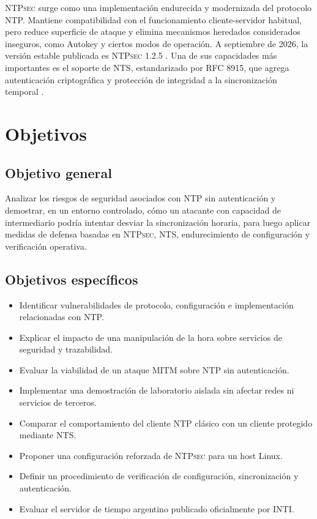 \documentclass[11pt,a4paper]{article}
\newcommand{\ntpsec}{\textsc{NTPsec}}
\newcommand{\nts}{\textsc{NTS}}
\begin{document}
\ntpsec{} surge como una implementación endurecida y modernizada del protocolo NTP. Mantiene compatibilidad con el funcionamiento cliente-servidor habitual, pero reduce superficie de ataque y elimina mecanismos heredados considerados inseguros, como Autokey y ciertos modos de operación. A septiembre de 2026, la versión estable publicada es \ntpsec{} 1.2.5 \cite{ntpsec125}. Una de sus capacidades más importantes es el soporte de \nts{}, estandarizado por RFC 8915, que agrega autenticación criptográfica y protección de integridad a la sincronización temporal \cite{rfc8915}.

\section{Objetivos}

\subsection{Objetivo general}
Analizar los riesgos de seguridad asociados con NTP sin autenticación y demostrar, en un entorno controlado, cómo un atacante con capacidad de intermediario podría intentar desviar la sincronización horaria, para luego aplicar medidas de defensa basadas en \ntpsec{}, \nts{}, endurecimiento de configuración y verificación operativa.

\subsection{Objetivos específicos}
\begin{itemize}
    \item Identificar vulnerabilidades de protocolo, configuración e implementación relacionadas con NTP.
    \item Explicar el impacto de una manipulación de la hora sobre servicios de seguridad y trazabilidad.
    \item Evaluar la viabilidad de un ataque MITM sobre NTP sin autenticación.
    \item Implementar una demostración de laboratorio aislada sin afectar redes ni servicios de terceros.
    \item Comparar el comportamiento del cliente NTP clásico con un cliente protegido mediante \nts{}.
    \item Proponer una configuración reforzada de \ntpsec{} para un host Linux.
    \item Definir un procedimiento de verificación de configuración, sincronización y autenticación.
    \item Evaluar el servidor de tiempo argentino publicado oficialmente por INTI.
\end{itemize}
\end{document}
